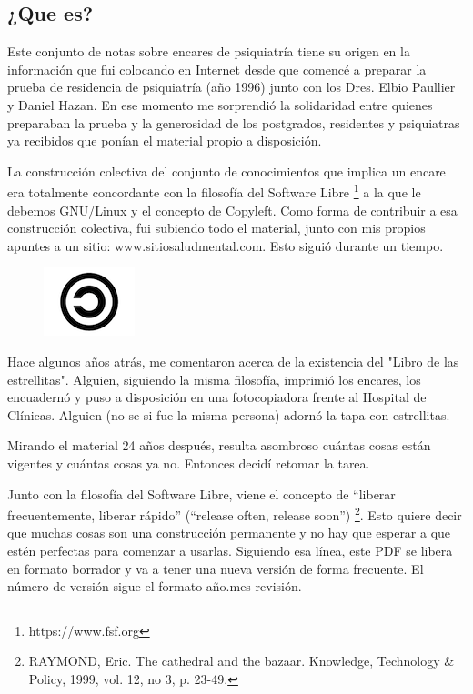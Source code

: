 \documentclass[encares.tex]{subfiles}
\begin{document}
\subsection*{¿Que es?}
Este conjunto de notas sobre encares de psiquiatría tiene su origen en la información que fui colocando en Internet desde que comencé a preparar la prueba de residencia de psiquiatría (año 1996) junto con los Dres. Elbio Paullier y Daniel Hazan. En ese momento me sorprendió la solidaridad entre quienes preparaban la prueba y la generosidad de los postgrados, residentes y psiquiatras ya recibidos que ponían el material propio a disposición.

La construcción colectiva del conjunto de conocimientos que implica un encare era totalmente concordante con la filosofía del Software Libre \footnote{https://www.fsf.org} a la que le debemos GNU/Linux y el concepto de Copyleft. Como forma de contribuir a esa construcción colectiva, fui subiendo todo el material, junto con mis propios apuntes a un sitio: www.sitiosaludmental.com. Esto siguió durante un tiempo.
\begin{figure}
	\centering
	\includegraphics{copyleft.png}
\end{figure}
Hace algunos años atrás, me comentaron acerca de la existencia del "Libro de las estrellitas". Alguien, siguiendo la misma filosofía, imprimió los encares, los encuadernó y puso a disposición en una fotocopiadora frente al Hospital de Clínicas. Alguien (no se si fue la misma persona) adornó la tapa con estrellitas.

Mirando el material 24 años después, resulta asombroso cuántas cosas están vigentes y cuántas cosas ya no. Entonces decidí retomar la tarea.

Junto con la filosofía del Software Libre, viene el concepto de ``liberar frecuentemente, liberar rápido'' (``release often, release soon'') \footnote{RAYMOND, Eric. The cathedral and the bazaar. Knowledge, Technology \& Policy, 1999, vol. 12, no 3, p. 23-49.}. Esto quiere decir que muchas cosas son una construcción permanente y no hay que esperar a que estén perfectas para comenzar a usarlas. Siguiendo esa línea, este PDF se libera en formato borrador y va a tener una nueva versión de forma frecuente. El número de versión sigue el formato año.mes-revisión.
\end{document}
